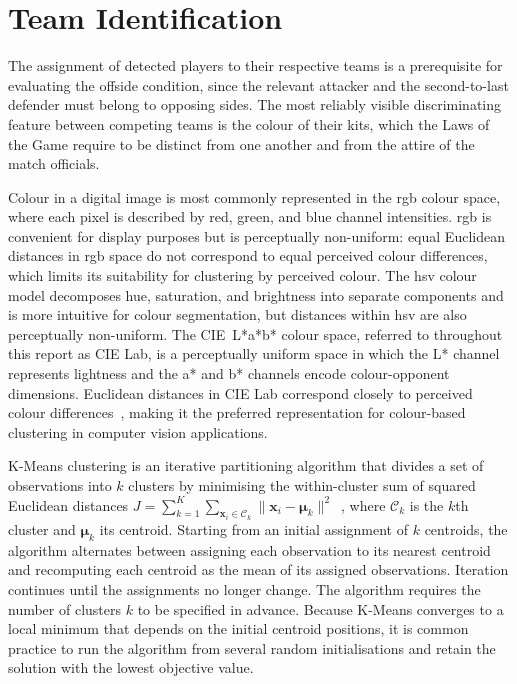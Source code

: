 \section{Team Identification}%
\label{sec:bg_team_id}

The assignment of detected players to their respective teams is a prerequisite for evaluating the offside condition, since the relevant attacker and the second-to-last defender must belong to opposing sides. The most reliably visible discriminating feature between competing teams is the colour of their kits, which the Laws of the Game require to be distinct from one another and from the attire of the match officials.

Colour in a digital image is most commonly represented in the \gls{rgb} colour space, where each pixel is described by red, green, and blue channel intensities. \gls{rgb} is convenient for display purposes but is perceptually non-uniform: equal Euclidean distances in \gls{rgb} space do not correspond to equal perceived colour differences, which limits its suitability for clustering by perceived colour. The \gls{hsv} colour model decomposes hue, saturation, and brightness into separate components and is more intuitive for colour segmentation, but distances within \gls{hsv} are also perceptually non-uniform. The CIE~L*a*b* colour space, referred to throughout this report as CIE Lab, is a perceptually uniform space in which the L* channel represents lightness and the a* and b* channels encode colour-opponent dimensions. Euclidean distances in CIE Lab correspond closely to perceived colour differences~\cite{gonzalez2018dip}, making it the preferred representation for colour-based clustering in computer vision applications.

K-Means clustering is an iterative partitioning algorithm that divides a set of observations into $k$ clusters by minimising the within-cluster sum of squared Euclidean distances $J = \sum_{k=1}^{K} \sum_{\mathbf{x}_i \in \mathcal{C}_k} \|\mathbf{x}_i - \boldsymbol{\mu}_k\|^2$~\cite{macqueen1967kmeans}, where $\mathcal{C}_k$ is the $k$th cluster and $\boldsymbol{\mu}_k$ its centroid. Starting from an initial assignment of $k$ centroids, the algorithm alternates between assigning each observation to its nearest centroid and recomputing each centroid as the mean of its assigned observations. Iteration continues until the assignments no longer change. The algorithm requires the number of clusters $k$ to be specified in advance. Because K-Means converges to a local minimum that depends on the initial centroid positions, it is common practice to run the algorithm from several random initialisations and retain the solution with the lowest objective value.


